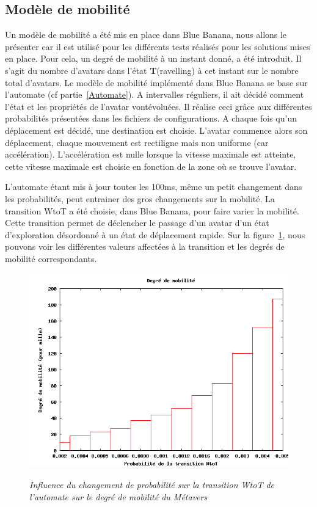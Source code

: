 \subsection{Modèle de mobilité}

Un modèle de mobilité a été mis en place dans Blue Banana, nous allons le présenter car il est utilisé pour les différents tests réalisés pour les solutions mises en place. Pour cela, un degré de mobilité à un instant donné, a été introduit. Il s'agit du nombre d'avatars dans l'état \textbf{T}(ravelling) à cet instant sur le nombre total d'avatars. Le modèle de mobilité implémenté dans Blue Banana se base sur l'automate (cf partie~\ref{Automate}). A intervalles réguliers, il ait décidé comment l'état et les propriétés de l'avatar vontévoluées. Il réalise ceci grâce aux différentes probabilités présentées dans les fichiers de configurations. A chaque fois qu'un déplacement est décidé, une destination est choisie. L'avatar commence alors son déplacement, chaque mouvement est rectiligne mais non uniforme (car accélération). L'accélération est nulle lorsque la vitesse maximale est atteinte, cette vitesse maximale est choisie en fonction de la zone où se trouve l'avatar.


\par L'automate étant mis à jour toutes les 100ms, même un petit changement dans les probabilités, peut entrainer des gros changements sur la mobilité. La transition WtoT a été choisie, dans Blue Banana, pour faire varier la mobilité. Cette transition permet de déclencher le passage d'un avatar d'un état d'exploration désordonné à un état de déplacement rapide. Sur la figure~\ref{fig:mobility}, nous pouvons voir les différentes valeurs affectées à la transition et les degrés de mobilité correspondants. 

\begin{figure}
  \begin{center}
    \includegraphics[scale=0.40]{./Ressources/Images/mobility.png} \\
    \caption{\textit{\small Influence du changement de probabilité sur
        la transition WtoT de l'automate sur le degré de mobilité du
        Métavers}}
    \label{fig:mobility}
  \end{center}
\end{figure}


